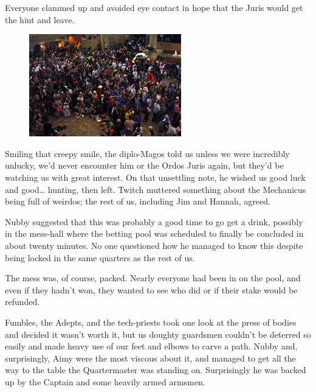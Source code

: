 Everyone clammed up and avoided eye contact in hope that the Juris would get the hint and leave.

\begin{figure}
	\begin{center}
		\includegraphics[width=\figwidth]{pics/11/103.png}
	\end{center}
\end{figure}
Smiling that creepy smile, the diplo-Magos told us unless we were incredibly unlucky, we'd never encounter him or the Ordos Juris again, but they'd be watching us with great interest. 
On that unsettling note, he wished us good luck and good… hunting, then left. 
Twitch muttered something about the Mechanicus being full of weirdos; 
the rest of us, including Jim and Hannah, agreed.

Nubby suggested that this was probably a good time to go get a drink, possibly in the mess-hall where the betting pool was scheduled to finally be concluded in about twenty minutes. 
No one questioned how he managed to know this despite being locked in the same quarters as the rest of us.

The mess was, of course, packed. 
Nearly everyone had been in on the pool, and even if they hadn't won, they wanted to see who did or if their stake would be refunded.

Fumbles, the Adepts, and the tech-priests took one look at the press of bodies and decided it wasn't worth it, but us doughty guardsmen couldn't be deterred so easily and made heavy use of our feet and elbows to carve a path. 
Nubby and, surprisingly, Aimy were the most viscous about it, and managed to get all the way to the table the Quartermaster was standing on. 
Surprisingly he was backed up by the Captain and some heavily armed armsmen.

